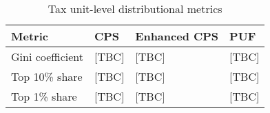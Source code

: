 \begin{table}[h]
    \centering
    \caption{Tax unit-level distributional metrics}
    \label{tab:tax_unit_metrics}
    \begin{tabular}{llll}
    \toprule
    Metric & CPS & Enhanced CPS & PUF \\
    \midrule
    Gini coefficient & [TBC] & [TBC] & [TBC] \\
    Top 10\% share & [TBC] & [TBC] & [TBC] \\
    Top 1\% share & [TBC] & [TBC] & [TBC] \\
    \bottomrule
    \end{tabular}
\end{table}
